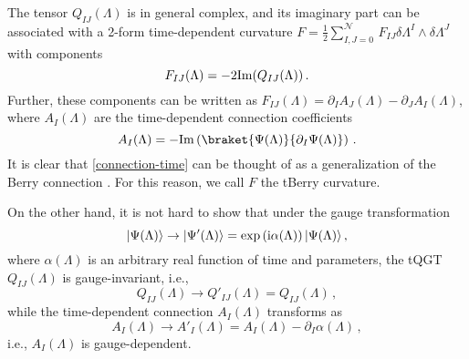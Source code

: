 \documentclass[12pt]{iopart}
\DeclarePairedDelimiter\ket{\lvert}{\rangle}
\begin{document}
The tensor $Q_{IJ}(\Lambda)$ is in general complex, and its imaginary part can be associated with a 2-form time-dependent curvature $F=\frac12 \sum_{I, J=0}^{\mathcal{N}} \, F_{IJ} \delta \Lambda^I \wedge  \delta \Lambda^J$ with components
\begin{equation}\label{Berry-tensor-time}
    F_{IJ}(\Lambda)=-2{\rm Im}(Q_{IJ}(\Lambda))\,.
\end{equation}
Further, these components can be written as $F_{IJ}(\Lambda)=\partial_I A_J(\Lambda) - \partial_J A_I(\Lambda)$, where $A_I(\Lambda)$ are the time-dependent connection coefficients
\begin{equation}\label{connection-time}
    A_I(\Lambda)= -{\rm Im}\left( \braket{\Psi(\Lambda)}{\partial_I\Psi(\Lambda)} \right)\,.
\end{equation}
It is clear that \eqref{connection-time} can be thought of as a generalization of the Berry connection \cite{Berry1984}. For this reason, we call $F$ the tBerry curvature.

On the other hand, it is not hard to show that under the gauge transformation\begin{equation}
\ket{\Psi(\Lambda)} \rightarrow \ket{\Psi'(\Lambda)}=\exp{(\rm i \alpha(\Lambda))} \,  \ket{\Psi(\Lambda)}\,, \label{gauge} 
\end{equation}
where $\alpha(\Lambda)$ is an arbitrary real function of time and parameters, the tQGT $Q_{IJ}(\Lambda)$ is gauge-invariant, i.e.,
\begin{equation}
    Q_{IJ}(\Lambda) \rightarrow Q'_{IJ}(\Lambda) = Q_{IJ}(\Lambda)\,,
\end{equation}
while the time-dependent connection $A_I(\Lambda)$ transforms as
\begin{equation}\label{connection-time-gauge}
  A_I(\Lambda) \rightarrow A'_I(\Lambda) = A_I(\Lambda) - \partial_I \alpha(\Lambda)\,,
\end{equation}
i.e., $A_I(\Lambda)$ is gauge-dependent.
\end{document}
